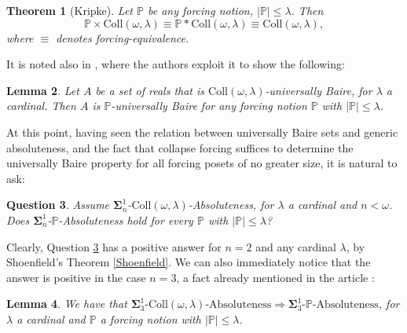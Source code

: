 \documentclass[10pt]{amsart}
\renewcommand\le\leqslant
\newtheorem{theorem}{Theorem}[section]
\newtheorem{lemma}[theorem]{Lemma}
\newtheorem{question}[theorem]{Question}
\theoremstyle{definition}
\begin{document}
\begin{theorem}[Kripke]\label{terminal}
    Let $\mathbb P$ be any forcing notion, $|\mathbb P|\le\lambda$. Then
    \[\mathbb P\times \mathrm{Coll}(\omega,\lambda)\equiv \mathbb P\ast \mathrm{Coll}(\omega, \lambda)\equiv \mathrm{Coll}(\omega,\lambda),\]
    where $\equiv$ denotes forcing-equivalence.
\end{theorem}

 It is noted also in \cite{FMW}, where the authors exploit it to show the following:

\begin{lemma}\label{uBdown}
    Let $A$ be a set of reals that is $\mathrm{Coll}(\omega,\lambda)$-universally Baire, for $\lambda$ a cardinal. Then $A$ is $\mathbb P$-universally Baire for any forcing notion $\mathbb P$ with $|\mathbb P|\le\lambda$.
\end{lemma}

At this point, having seen the relation between universally Baire sets and generic absoluteness, and the fact that collapse forcing suffices to determine the universally Baire property for all forcing posets of no greater size, it is natural to ask:

\begin{question}\label{lukas}
    Assume $\boldsymbol\Sigma^1_n$-$\mathrm{Coll}(\omega,\lambda)$-Absoluteness, for $\lambda$ a cardinal and $n<\omega$. Does $\boldsymbol\Sigma^1_n$-$\mathbb P$-Absoluteness hold for every $\mathbb P$ with $|\mathbb P|\le\lambda$?
\end{question}

Clearly, Question \ref{lukas} has a positive answer for $n=2$ and any cardinal $\lambda$, by Shoenfield's Theorem \ref{Shoenfield}. We can also immediately notice that the answer is positive in the case $n=3$, a fact already mentioned in the article \cite{FMW}:

\begin{lemma}\label{n=3}
We have that  $\boldsymbol\Sigma^1_{3}\text{-}\mathrm{Coll}(\omega,\lambda)\text{-Absoluteness} \Rightarrow \boldsymbol\Sigma^1_{3}\text{-}\mathbb P\text{-Absoluteness}$, for $\lambda$ a cardinal and $\mathbb P$ a forcing notion with $|\mathbb P|\le\lambda$.
\end{lemma}
\end{document}
